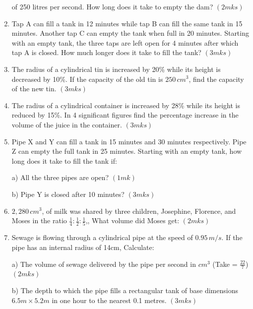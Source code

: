 \documentclass[
  a4paperpaper,
]{scrbook}
\begin{document}
\begin{tcolorbox}
\begin{enumerate}
  of 250 litres per second. How long does it take to empty the dam?
  \hspace{12.7 cm} \((2mks)\)
\item
  Tap A can fill a tank in 12 minutes while tap B can fill the same tank
  in 15 minutes. Another tap C can empty the tank when full in 20
  minutes. Starting with an empty tank, the three taps are left open for
  4 minutes after which tap A is closed. How much longer does it take to
  fill the tank? \hspace{13.2 cm} \((3mks)\)
\item
  The radius of a cylindrical tin is increased by 20\% while its height
  is decreased by 10\%. If the capacity of the old tin is \(250\,cm^3\),
  find the capacity of the new tin. \hspace{4cm} \((3mks)\)
\item
  The radius of a cylindrical container is increased by 28\% while its
  height is reduced by 15\%. In 4 significant figures find the
  percentage increase in the volume of the juice in the
  container.\hspace{0cm} \((3mks)\)
\item
  Pipe X and Y can fill a tank in 15 minutes and 30 minutes
  respectively. Pipe Z can empty the full tank in 25 minutes. Starting
  with an empty tank, how long does it take to fill the tank if:

  a) All the three pipes are open? \hspace{8.6 cm} \((1mk)\)

  b) Pipe Y is closed after 10 minutes? \hspace{7.8 cm} \((3mks)\)
\item
  \(2,280 \,cm^3\), of milk was shared by three children, Josephine,
  Florence, and Moses in the ratio
  \(\frac{1}{4}:\frac{1}{2}:\frac{1}{5}\),, What volume did Moses get:
  \hspace{8.2 cm} \((2mks)\)
\item
  Sewage is flowing through a cylindrical pipe at the speed of
  \(0.95\,m/s\). If the pipe has an internal radius of 14cm, Calculate:

  a) The volume of sewage delivered by the pipe per second in \(cm^3\)
  (Take = \(\frac{22}{7}\)) \hspace{1 cm} \((2mks)\)

  b) The depth to which the pipe fills a rectangular tank of base
  dimensions \(6.5m \times 5.2m\) in one hour to the nearest 0.1 metres.
  \hspace{8.5 cm} \((3mks)\)


\end{enumerate}
\end{tcolorbox}
\end{document}
